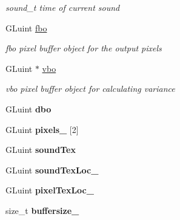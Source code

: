 \begin{DoxyCompactItemize}
\begin{DoxyCompactList}\small\item\em sound\+\_\+t time of current sound \end{DoxyCompactList}\item 
\hypertarget{classglrenderer_a9290e152323d6ea26964685e5aa8b547}{G\+Luint \hyperlink{classglrenderer_a9290e152323d6ea26964685e5aa8b547}{fbo}}\label{classglrenderer_a9290e152323d6ea26964685e5aa8b547}

\begin{DoxyCompactList}\small\item\em fbo pixel buffer object for the output pixels \end{DoxyCompactList}\item 
\hypertarget{classglrenderer_a5f72e06bbeea3d339200ecc30be840d7}{G\+Luint $\ast$ \hyperlink{classglrenderer_a5f72e06bbeea3d339200ecc30be840d7}{vbo}}\label{classglrenderer_a5f72e06bbeea3d339200ecc30be840d7}

\begin{DoxyCompactList}\small\item\em vbo pixel buffer object for calculating variance \end{DoxyCompactList}\item 
\hypertarget{classglrenderer_a7df05aa3b22a05dc12e13d0d624bd0c0}{G\+Luint {\bfseries dbo}}\label{classglrenderer_a7df05aa3b22a05dc12e13d0d624bd0c0}

\item 
\hypertarget{classglrenderer_a122c79aaf9596256554145d36b134c0f}{G\+Luint {\bfseries pixels\+\_\+} \mbox{[}2\mbox{]}}\label{classglrenderer_a122c79aaf9596256554145d36b134c0f}

\item 
\hypertarget{classglrenderer_aec06d37529a85996e6a07f92782870c1}{G\+Luint {\bfseries sound\+Tex}}\label{classglrenderer_aec06d37529a85996e6a07f92782870c1}

\item 
\hypertarget{classglrenderer_acfa2e1407c1dcb33c143f946b86c7eb5}{G\+Luint {\bfseries sound\+Tex\+Loc\+\_\+}}\label{classglrenderer_acfa2e1407c1dcb33c143f946b86c7eb5}

\item 
\hypertarget{classglrenderer_ad57c1067763fa41daf76bb9df001c746}{G\+Luint {\bfseries pixel\+Tex\+Loc\+\_\+}}\label{classglrenderer_ad57c1067763fa41daf76bb9df001c746}

\item 
\hypertarget{classglrenderer_adae4055c80604f2c8b157764edb1c6b9}{size\+\_\+t {\bfseries buffersize\+\_\+}}\label{classglrenderer_adae4055c80604f2c8b157764edb1c6b9}


\end{DoxyCompactItemize}
